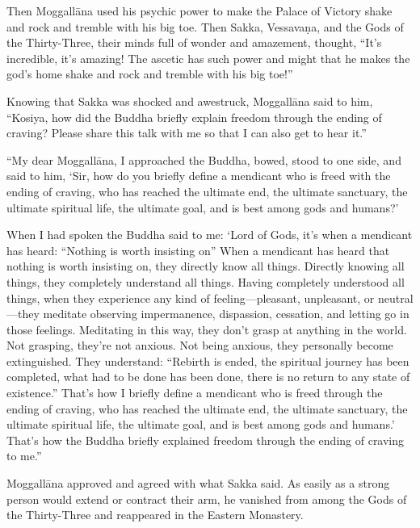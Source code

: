 \documentclass[12pt,openany]{book}%
\begin{document}
Then \textsanskrit{Moggallāna} used his psychic power to make the Palace of Victory shake and rock and tremble with his big toe. Then Sakka, \textsanskrit{Vessavaṇa}, and the Gods of the Thirty-Three, their minds full of wonder and amazement, thought, “It’s incredible, it’s amazing! The ascetic has such power and might that he makes the god’s home shake and rock and tremble with his big toe!” 

Knowing that Sakka was shocked and awestruck, \textsanskrit{Moggallāna} said to him, “Kosiya, how did the Buddha briefly explain freedom through the ending of craving? Please share this talk with me so that I can also get to hear it.” 

“My dear \textsanskrit{Moggallāna}, I approached the Buddha, bowed, stood to one side, and said to him, ‘Sir, how do you briefly define a mendicant who is freed with the ending of craving, who has reached the ultimate end, the ultimate sanctuary, the ultimate spiritual life, the ultimate goal, and is best among gods and humans?’ 

When I had spoken the Buddha said to me: ‘Lord of Gods, it’s when a mendicant has heard: “Nothing is worth insisting on” When a mendicant has heard that nothing is worth insisting on, they directly know all things. Directly knowing all things, they completely understand all things. Having completely understood all things, when they experience any kind of feeling—pleasant, unpleasant, or neutral—they meditate observing impermanence, dispassion, cessation, and letting go in those feelings. Meditating in this way, they don’t grasp at anything in the world. Not grasping, they’re not anxious. Not being anxious, they personally become extinguished. They understand: “Rebirth is ended, the spiritual journey has been completed, what had to be done has been done, there is no return to any state of existence.” That’s how I briefly define a mendicant who is freed through the ending of craving, who has reached the ultimate end, the ultimate sanctuary, the ultimate spiritual life, the ultimate goal, and is best among gods and humans.’ That’s how the Buddha briefly explained freedom through the ending of craving to me.” 

\textsanskrit{Moggallāna} approved and agreed with what Sakka said. As easily as a strong person would extend or contract their arm, he vanished from among the Gods of the Thirty-Three and reappeared in the Eastern Monastery. 
\end{document}
